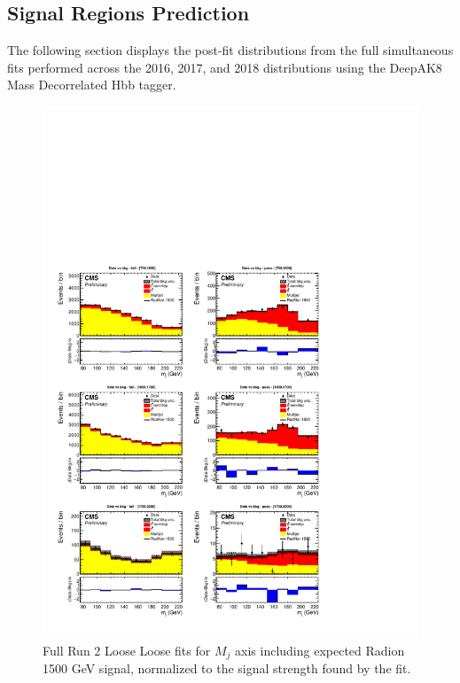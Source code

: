 \subsection{Signal Regions Prediction\label{ss:BkgInSigRegion}}
The following section displays the post-fit distributions from the full simultaneous fits performed across the 2016, 2017, and 2018 distributions using the DeepAK8 Mass Decorrelated Hbb tagger.
\begin{figure}[!htb]
	\centering
	\includegraphics[width=1\textwidth]{Figures/postfit_projx_fits_LL.pdf}
	\caption{Full Run 2 Loose Loose fits for $M_j$ axis including expected Radion 1500 GeV signal, normalized to the signal strength found by the fit.}
	\label{fig:LLmj}
\end{figure}
